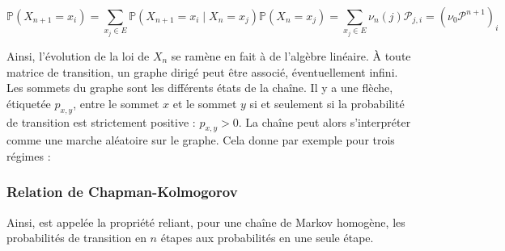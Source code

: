 \begin{sloppypar}
\begin{equation}
   \mathbb{P}(X_{n+1} = x_i) = \sum_{x_j \in E} \mathbb{P}(X_{n+1} = x_i \mid X_n = x_j) \mathbb{P}(X_n = x_j) = \sum_{x_j \in E} \nu_n(j) \mathcal{P}_{j,i} = (\nu_0 \mathcal{P}^{n+1})_i 
\end{equation}

Ainsi, l'évolution de la loi de $X_n$ se ramène en fait à de l'algèbre linéaire. À toute matrice de transition, un graphe dirigé peut être associé, éventuellement infini. Les sommets du
graphe sont les différents états de la chaîne. Il y a une flèche, étiquetée $p_{x,y}$, entre le sommet $x$ et le
sommet $y$ si et seulement si la probabilité de transition est strictement positive : $p_{x,y} > 0$. La chaîne peut
alors s’interpréter comme une marche aléatoire sur le graphe. Cela donne par exemple pour trois régimes : 

\begin{center}
\end{center}

\subsubsection{Relation de Chapman-Kolmogorov}

Ainsi, est appelée la propriété reliant, pour une chaîne de Markov homogène, les probabilités de transition
en $n$ étapes aux probabilités en une seule étape.\\


\end{sloppypar}
